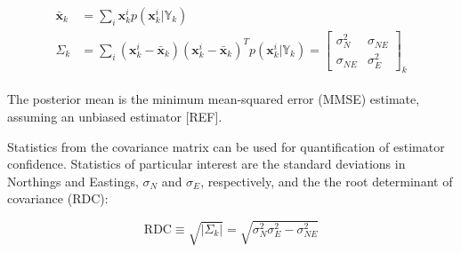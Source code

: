 \begin{align}
\begin{split}
\bar{\textbf{x}}_k &= \sum_i \mathbf{x}_k^{i} p(\mathbf{x}_k^{i} | \mathbb{Y}_k) \\
\Sigma_k &= \sum_i \left(\mathbf{x}_k^{i} - \bar{\textbf{x}}_k\right)\left(\mathbf{x}_k^{i} - \bar{\textbf{x}}_k\right)^{T} p(\mathbf{x}_k^{i} | \mathbb{Y}_k) = \begin{bmatrix} \sigma_N^{2} & \sigma_{NE} \\ \sigma_{NE} & \sigma_E^{2} \end{bmatrix}_k
\label{eq:meanCov}
\end{split}
\end{align}

The posterior mean is the minimum mean-squared error (MMSE) estimate, assuming an unbiased estimator [REF].

Statistics from the covariance matrix can be used for quantification of estimator confidence.
Statistics of particular interest are the standard deviations in Northings and Eastings, $\sigma_N$ and $\sigma_E$, respectively, and the the root determinant of covariance (RDC):

\begin{equation}
\text{RDC} \equiv \sqrt{| \Sigma_k | } = \sqrt{ \sigma_N^{2} \sigma_E^{2} - \sigma_{NE}^{2} }
\end{equation}

